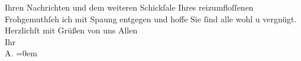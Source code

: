 \pstart
           Ihren Nachrichten und dem weiteren Schickſale Ihres reizumfloſſenen Frohgemuthſeh ich mit Spa{\geminationn}ung entgegen und hoffe Sie{ }ſind alle wohl u vergnügt.
               Herzlichſt mit Grüßen von uns Allen {\\[\baselineskip]}Ihr {\\[\baselineskip]}\spacefill\mbox{A.}\pend
           \leftskip=0em{}\endnumbering{}  \newcommand{\dateiname}{L03018}\newcommand{\titel}{Arthur Schnitzler an Felix Salten, 8. 8. 191[0]}\newcommand{\editorInnen}{Martin Anton Müller und Laura Untner}
